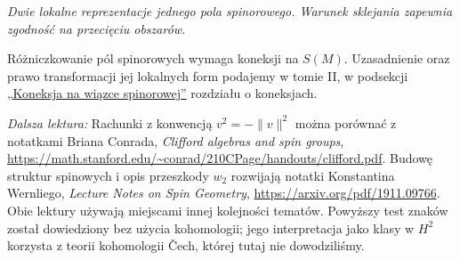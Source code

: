 \begin{center}

{\small\itshape Dwie lokalne reprezentacje jednego pola spinorowego.
Warunek sklejania zapewnia zgodność na przecięciu obszarów.}
\end{center}

Różniczkowanie pól spinorowych wymaga koneksji na $S(M)$.
Uzasadnienie oraz prawo transformacji jej lokalnych form
podajemy w tomie II, w podsekcji
\hyperref[sec:koneksja-spinorowa-transformacja]{„Koneksja na wiązce spinorowej”}
rozdziału o koneksjach.


\par\smallskip
{\footnotesize\noindent\emph{Dalsza lektura:}
Rachunki z konwencją $v^2=-\|v\|^2$
można porównać z notatkami Briana Conrada,
\emph{Clifford algebras and spin groups},
\url{https://math.stanford.edu/~conrad/210CPage/handouts/clifford.pdf}.
Budowę struktur spinowych i opis przeszkody
$w_2$ rozwijają notatki Konstantina Wernliego,
\emph{Lecture Notes on Spin Geometry},
\url{https://arxiv.org/pdf/1911.09766}.
Obie lektury używają miejscami innej kolejności tematów.
Powyższy test znaków został dowiedziony bez użycia kohomologii;
jego interpretacja jako klasy w $H^2$ korzysta z teorii
kohomologii Čech, której tutaj nie dowodziliśmy.\par}
\clearpage

